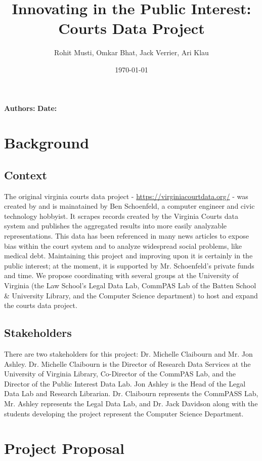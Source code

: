 \documentclass[12pt]{article}
\title{Innovating in the Public Interest:\\Courts Data Project}
\author{Rohit Musti, Omkar Bhat, Jack Verrier, Ari Klau}
\date{\today}
\renewcommand{\maketitle}{
    
    {\noindent\huge\bfseries\thetitle}

    \vspace{0.25em}
    {\noindent \textbf{Authors:} \theauthor} 
    {\noindent \textbf{Date:} \thedate}

}
\begin{document}
 

\maketitle

\section{Background}

\subsection{Context}

\noindent The original virginia courts data project - \url{https://virginiacourtdata.org/}  -  was created by and is mainatained by Ben Schoenfeld, a computer engineer and civic technology hobbyist.
It scrapes records created by the Virginia Courts data system and publishes the aggregated results into more easily analyzable representations.
This data has been referenced in many news articles to expose bias within the court system and to analyze widespread social problems, like medical debt.
Maintaining this project and improving upon it is certainly in the public interest; at the moment, it is supported by Mr. Schoenfeld's private funds and time.
We propose coordinating with several groups at the University of Virginia (the Law School's Legal Data Lab, CommPAS Lab of the Batten School \& University Library, and the Computer Science department) to host and expand the courts data project.

\subsection{Stakeholders}

\noindent There are two stakeholders for this project: Dr. Michelle Claibourn and Mr. Jon Ashley. 
Dr. Michelle Claibourn is the Director of Research Data Services at the University of Virginia Library, Co-Director of the CommPAS Lab, and the Director of the Public Interest Data Lab.
Jon Ashley is the Head of the Legal Data Lab and Research Librarian.
Dr. Claibourn represents the CommPASS Lab, Mr. Ashley represents the Legal Data Lab, and Dr. Jack Davidson along with the students developing the project represent the Computer Science Department.

\section{Project Proposal}
\end{document}
